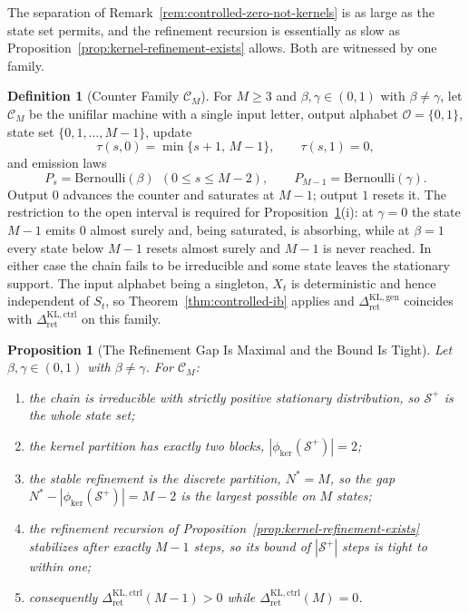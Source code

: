 \documentclass[12pt]{article}
\newtheorem{proposition}[theorem]{Proposition}
\theoremstyle{definition}
\newtheorem{definition}[theorem]{Definition}
\newcommand{\Splus}{\mathcal S^{+}}
\newcommand{\RetKLc}{\Delta_{\mathrm{ret}}^{\mathrm{KL,ctrl}}}
\newcommand{\RetKLg}{\Delta_{\mathrm{ret}}^{\mathrm{KL,gen}}}
\begin{document}
The separation of Remark~\ref{rem:controlled-zero-not-kernels} is as large as
the state set permits, and the refinement recursion is essentially as slow as
Proposition~\ref{prop:kernel-refinement-exists} allows.  Both are witnessed by
one family.

\begin{definition}[Counter Family $\mathcal C_M$]
\label{def:counter-family}
For $M\ge3$ and $\beta,\gamma\in(0,1)$ with $\beta\neq\gamma$, let
$\mathcal C_M$ be the unifilar machine with a single input letter, output
alphabet $\mathcal O=\{0,1\}$, state set $\{0,1,\dots,M-1\}$, update
\[
\tau(s,0)=\min\{s+1,\,M-1\},
\qquad
\tau(s,1)=0,
\]
and emission laws
\[
P_s=\mathrm{Bernoulli}(\beta)\ \ (0\le s\le M-2),
\qquad
P_{M-1}=\mathrm{Bernoulli}(\gamma).
\]
Output $0$ advances the counter and saturates at $M-1$; output $1$ resets it.
The restriction to the open interval is required for
Proposition~\ref{prop:refinement-extremal}(i): at $\gamma=0$ the state $M-1$
emits $0$ almost surely and, being saturated, is absorbing, while at $\beta=1$
every state below $M-1$ resets almost surely and $M-1$ is never reached.  In
either case the chain fails to be irreducible and some state leaves the
stationary support.  The input alphabet being a singleton, $X_t$ is
deterministic and hence independent of $S_t$, so
Theorem~\ref{thm:controlled-ib} applies and $\RetKLg$ coincides with
$\RetKLc$ on this family.
\end{definition}

\begin{proposition}[The Refinement Gap Is Maximal and the Bound Is Tight]
\label{prop:refinement-extremal}
Let $\beta,\gamma\in(0,1)$ with $\beta\neq\gamma$.  For $\mathcal C_M$:
\begin{enumerate}[label=(\roman*)]
\item the chain is irreducible with strictly positive stationary
distribution, so $\Splus$ is the whole state set;
\item the kernel partition has exactly two blocks,
$|\phi_{\ker}(\Splus)|=2$;
\item the stable refinement is the discrete partition, $N^{\ast}=M$, so the
gap $N^{\ast}-|\phi_{\ker}(\Splus)|=M-2$ is the largest possible on $M$
states;
\item the refinement recursion of
Proposition~\ref{prop:kernel-refinement-exists} stabilizes after exactly
$M-1$ steps, so its bound of $|\Splus|$ steps is tight to within one;
\item consequently $\RetKLc(M-1)>0$ while $\RetKLc(M)=0$.
\end{enumerate}
\end{proposition}
\end{document}
